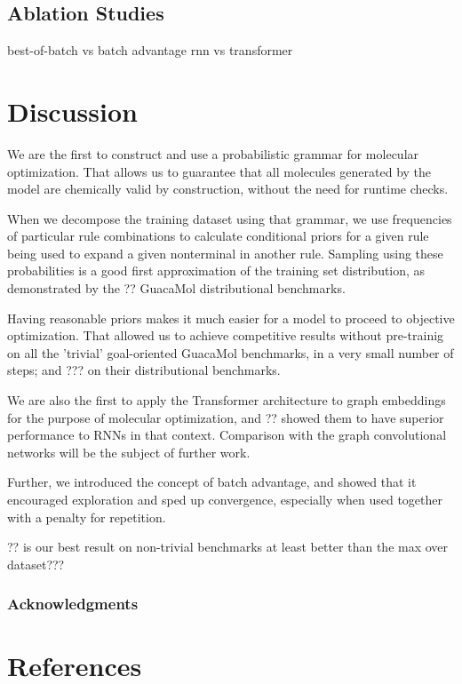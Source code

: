 \documentclass{article}
\begin{document}
\subsection{Ablation Studies}
best-of-batch vs batch advantage
rnn vs transformer

\section{Discussion}
We are the first to construct and use a probabilistic grammar for molecular optimization. That allows us to guarantee that all molecules generated by the model are chemically valid by construction, without the need for runtime checks. 

When we decompose the training dataset using that grammar, we use frequencies of particular rule combinations to calculate conditional priors for a given rule being used to expand a given nonterminal in another rule. Sampling using these probabilities is a good first approximation of the training set distribution, as demonstrated by the ?? GuacaMol distributional benchmarks.

Having reasonable priors makes it much easier for a model to proceed to objective optimization. That allowed us to achieve competitive results without pre-trainig on all the 'trivial' goal-oriented GuacaMol benchmarks, in a very small number of steps;  and ??? on their distributional benchmarks.

We are also the first to apply the Transformer architecture to graph embeddings for the purpose of molecular optimization, and ?? showed them to have superior performance to RNNs in that context. Comparison with the graph convolutional networks will be the subject of further work.

Further, we introduced the concept of batch advantage, and showed that it encouraged exploration and sped up convergence, especially when used together with a penalty for repetition.

?? is our best result on non-trivial benchmarks at least better than the max over dataset???


\subsubsection*{Acknowledgments}

\section*{References}
\medskip

\small
 

\end{document}
